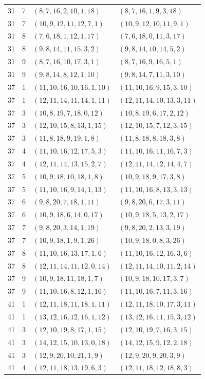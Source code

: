 \documentclass[11pt,a4paper]{article}
\theoremstyle{definition}
\numberwithin{equation}{section}
\begin{document}
\begin{longtable}{rrll}
31&7&$(8,7,16,2,10,1,18)$&$(8,7,16,1,9,3,18)$\\
31&7&$(10,9,12,11,12,7,1)$&$(10,9,12,10,11,9,1)$\\
31&8&$(7,6,18,1,12,1,17)$&$(7,6,18,0,11,3,17)$\\
31&8&$(9,8,14,11,15,3,2)$&$(9,8,14,10,14,5,2)$\\
31&9&$(8,7,16,10,17,3,1)$&$(8,7,16,9,16,5,1)$\\
31&9&$(9,8,14,8,12,1,10)$&$(9,8,14,7,11,3,10)$\\
37&1&$(11,10,16,10,16,1,10)$&$(11,10,16,9,15,3,10)$\\
37&1&$(12,11,14,11,14,1,11)$&$(12,11,14,10,13,3,11)$\\
37&3&$(10,8,19,7,18,0,12)$&$(10,8,19,6,17,2,12)$\\
37&3&$(12,10,15,8,13,1,15)$&$(12,10,15,7,12,3,15)$\\
37&3&$(11,8,18,9,19,1,8)$&$(11,8,18,8,18,3,8)$\\
37&4&$(11,10,16,12,17,5,3)$&$(11,10,16,11,16,7,3)$\\
37&4&$(12,11,14,13,15,2,7)$&$(12,11,14,12,14,4,7)$\\
37&5&$(10,9,18,10,18,1,8)$&$(10,9,18,9,17,3,8)$\\
37&5&$(11,10,16,9,14,1,13)$&$(11,10,16,8,13,3,13)$\\
37&6&$(9,8,20,7,18,1,11)$&$(9,8,20,6,17,3,11)$\\
37&6&$(10,9,18,6,14,0,17)$&$(10,9,18,5,13,2,17)$\\
37&7&$(9,8,20,3,14,1,19)$&$(9,8,20,2,13,3,19)$\\
37&7&$(10,9,18,1,9,1,26)$&$(10,9,18,0,8,3,26)$\\
37&8&$(11,10,16,13,17,1,6)$&$(11,10,16,12,16,3,6)$\\
37&8&$(12,11,14,11,12,0,14)$&$(12,11,14,10,11,2,14)$\\
37&9&$(10,9,18,11,18,1,7)$&$(10,9,18,10,17,3,7)$\\
37&9&$(11,10,16,8,12,1,16)$&$(11,10,16,7,11,3,16)$\\
41&1&$(12,11,18,11,18,1,11)$&$(12,11,18,10,17,3,11)$\\
41&1&$(13,12,16,12,16,1,12)$&$(13,12,16,11,15,3,12)$\\
41&3&$(12,10,19,8,17,1,15)$&$(12,10,19,7,16,3,15)$\\
41&3&$(14,12,15,10,13,0,18)$&$(14,12,15,9,12,2,18)$\\
41&3&$(12,9,20,10,21,1,9)$&$(12,9,20,9,20,3,9)$\\
41&4&$(12,11,18,13,19,6,3)$&$(12,11,18,12,18,8,3)$\\

\end{longtable}
\end{document}
